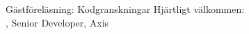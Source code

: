

\begin{Slide}{Gästföreläsning: Kodgranskningar}
Hjärtligt välkommen: \\ , Senior Developer, Axis
\end{Slide}

\fi
